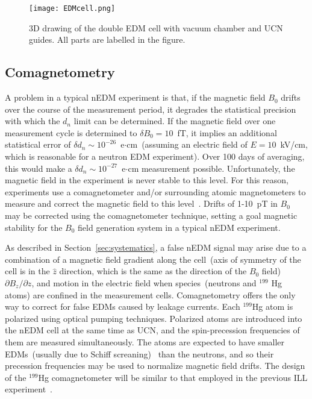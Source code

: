 \begin{figure}[h!]
  \centering
  \texttt{[image: EDMcell.png]}
  \caption[3D drawing of TUCAN's double EDM cell]{3D drawing of the
    double EDM cell with vacuum chamber and UCN guides. All parts are
    labelled in the figure.}
  \label{fig:HVcell}
\end{figure}



\subsection{Comagnetometry~\label{sec:comag}}
A problem in a typical nEDM experiment is that, if the magnetic field
$B_0$ drifts over the course of the measurement period, it degrades
the statistical precision with which the $d_n$ limit can be
determined.  If the magnetic field over one measurement cycle is
determined to $\delta B_0=10$~fT, it implies an additional statistical
error of $\delta d_n\sim 10^{-26}$~e$\cdot$cm~(assuming an electric
field of $E=10$~kV/cm, which is reasonable for a neutron EDM
experiment). Over 100 days of averaging, this would make a
$\delta d_n\sim 10^{-27}$~e$\cdot$cm measurement possible.
Unfortunately, the magnetic field in the experiment is never stable to
this level.  For this reason, experiments use a comagnetometer and/or
surrounding atomic magnetometers to measure and correct the magnetic
field to this
level~\cite{Baker2006,brys2005magnetic,afach2014dynamic}. Drifts of
1-10~pT in $B_0$ may be corrected using the comagnetometer technique,
setting a goal magnetic stability for the $B_0$ field generation
system in a typical nEDM experiment.



As described in Section~\ref{sec:systematics}, a false nEDM signal may
arise due to a combination of a magnetic field gradient along the
cell~(axis of symmetry of the cell is in the $\hat{z}$ direction,
which is the same as the direction of the $B_0$ field)
$\partial {B_z}/\partial z$, and motion in the electric field when
species~(neutrons and $^{199}$ Hg atoms) are confined in the
measurement cells. Comagnetometry offers the only way to correct for
false EDMs caused by leakage currents.  Each $^{199}$Hg atom is
polarized using optical pumping techniques. Polarized atoms are
introduced into the nEDM cell at the same time as UCN, and the
spin-precession frequencies of them are measured simultaneously. The
atoms are expected to have smaller EDMs~(usually due to Schiff
screaning)~\cite{pospelov2005electric} than the neutrons, and so their
precession frequencies may be used to normalize magnetic field drifts.
The design of the $^{199}$Hg comagnetometer will be similar to that
employed in the previous ILL experiment~\cite{Baker2006,Griffith2009}.

